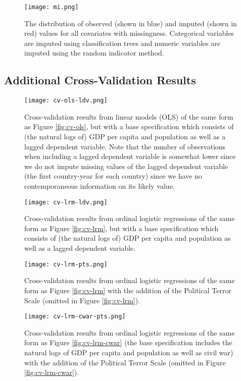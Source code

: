 \documentclass[11pt]{article}
\begin{document}
\begin{figure}[!htpb]
\centering
\texttt{[image: mi.png]}
\caption{The distribution of observed (shown in blue) and imputed (shown in red) values for all covariates with missingness. Categorical variables are imputed using classification trees and numeric variables are imputed using the random indicator method.}
\label{fig:mi}
\end{figure}

\clearpage

\subsection{Additional Cross-Validation Results}

\begin{figure}[!htpb]
\texttt{[image: cv-ols-ldv.png]}
\caption{Cross-validation results from linear models (OLS) of the same form as Figure \ref{fig:cv-ols}, but with a base specification which consists of (the natural logs of) GDP per capita and population as well as a lagged dependent variable. Note that the number of observations when including a lagged dependent variable is somewhat lower since we do not impute missing values of the lagged dependent variable (the first country-year for each country) since we have no contemporaneous information on its likely value.}
\label{fig:cv-ols-ldv}
\end{figure}

\begin{figure}[!htpb]
\texttt{[image: cv-lrm-ldv.png]}
\caption{Cross-validation results from ordinal logistic regressions of the same form as Figure \ref{fig:cv-lrm}, but with a base specification which consists of (the natural logs of) GDP per capita and population as well as a lagged dependent variable.}
\label{fig:cv-lrm-ldv}
\end{figure}

\begin{figure}[!htpb]
\texttt{[image: cv-lrm-pts.png]}
\caption{Cross-validation results from ordinal logistic regressions of the same form as Figure \ref{fig:cv-lrm} with the addition of the Political Terror Scale (omitted in Figure \ref{fig:cv-lrm}).}
\label{fig:cv-lrm-pts}
\end{figure}

\begin{figure}[!htpb]
\texttt{[image: cv-lrm-cwar-pts.png]}
\caption{Cross-validation results from ordinal logistic regressions of the same form as Figure \ref{fig:cv-lrm-cwar} (the base specification includes the natural logs of GDP per capita and population as well as civil war) with the addition of the Political Terror Scale (omitted in Figure \ref{fig:cv-lrm-cwar}).}
\label{fig:cv-lrm-cwar-pts}
\end{figure}
\end{document}
